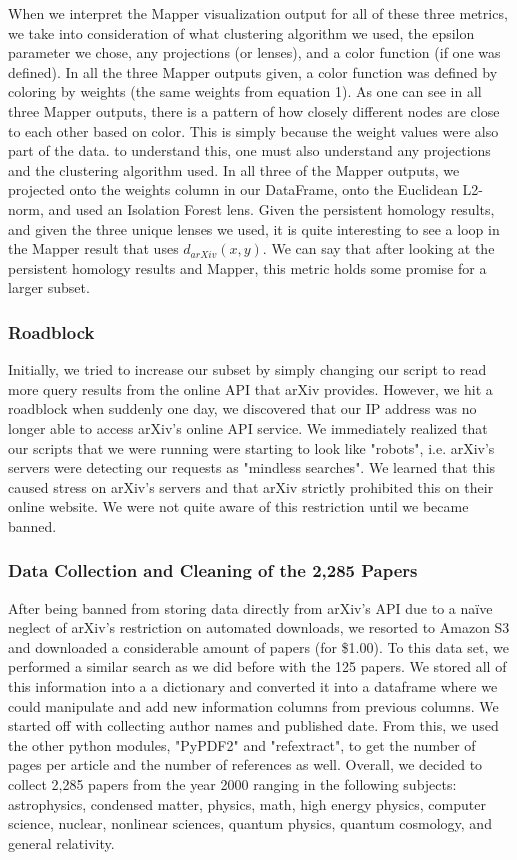 \documentclass[12pt]{article}
\theoremstyle{definition}
\begin{document}
\par When we interpret the Mapper visualization output for all of these three metrics, we take into consideration of what clustering algorithm we used, the epsilon parameter we chose, any projections (or lenses), and a color function (if one was defined). In all the three Mapper outputs given, a color function was defined by coloring by weights (the same weights from equation 1). As one can see in all three Mapper outputs, there is a pattern of how closely different nodes are close to each other based on color. This is simply because the weight values were also part of the data. to understand this, one must also understand any projections and the clustering algorithm used. In all three of the Mapper outputs, we projected onto the weights column in our DataFrame, onto the Euclidean L2-norm, and used an Isolation Forest lens. Given the persistent homology results, and given the three unique lenses we used, it is quite interesting to see a loop in the Mapper result that uses $d_{arXiv}(x,y)$. We can say that after looking at the persistent homology results and Mapper, this metric holds some promise for a larger subset. 

\subsubsection{Roadblock}

Initially, we tried to increase our subset by simply changing our script to read more query results from the online API that arXiv provides. However, we hit a roadblock when suddenly one day, we discovered that our IP address was no longer able to access arXiv's online API service. We immediately realized that our scripts that we were running were starting to look like "robots", i.e. arXiv's servers were detecting our requests as "mindless searches". We learned that this caused stress on arXiv's servers and that arXiv strictly prohibited this on their online website. We were not quite aware of this restriction until we became banned. 

\subsubsection{Data Collection and Cleaning of the 2,285 Papers}

After being banned from storing data directly from arXiv's API due to a na\"ive neglect of arXiv's restriction on automated downloads, we resorted to Amazon S3 and downloaded a considerable amount of papers (for \$1.00). To this data set, we performed a similar search as we did before with the 125 papers. We stored all of this information into a a dictionary and converted it into a dataframe where we could manipulate and add new information columns from previous columns. We started off with collecting author names and published date. From this, we used the other python modules, "PyPDF2" and "refextract", to get the number of pages per article and the number of references as well. Overall, we decided to collect 2,285 papers from the year 2000 ranging in the following subjects: astrophysics, condensed matter, physics, math, high energy physics, computer science, nuclear, nonlinear sciences, quantum physics, quantum cosmology, and general relativity.
\end{document}
